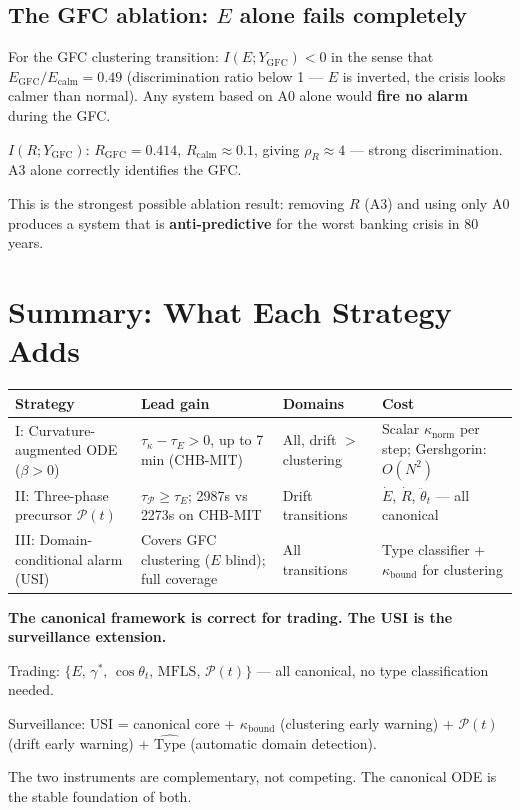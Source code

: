 \documentclass[11pt,a4paper]{article}
\theoremstyle{definition}
\begin{document}
\subsection{The GFC ablation: $E$ alone fails completely}

For the GFC clustering transition:
$I(E; Y_\mathrm{GFC}) < 0$ in the sense that $E_\mathrm{GFC}/E_\mathrm{calm} = 0.49$
(discrimination ratio below 1 --- $E$ is inverted, the crisis looks calmer than normal).
Any system based on A0 alone would \textbf{fire no alarm} during the GFC.

$I(R; Y_\mathrm{GFC})$: $R_\mathrm{GFC} = 0.414$, $R_\mathrm{calm} \approx 0.1$,
giving $\rho_R \approx 4$ --- strong discrimination.
A3 alone correctly identifies the GFC.

This is the strongest possible ablation result: removing $R$ (A3)
and using only A0 produces a system that is \textbf{anti-predictive}
for the worst banking crisis in 80 years.

\section{Summary: What Each Strategy Adds}
\label{sec:ew_summary}

\begin{center}
\renewcommand{\arraystretch}{1.4}
\begin{tabular}{p{3.5cm}p{3cm}p{3cm}p{3.5cm}}
\toprule
\textbf{Strategy} & \textbf{Lead gain} & \textbf{Domains} & \textbf{Cost} \\
\midrule
I: Curvature-augmented ODE ($\beta > 0$) &
$\tau_\kappa - \tau_E > 0$, up to 7 min (CHB-MIT) &
All, drift $>$ clustering &
Scalar $\kappa_\mathrm{norm}$ per step; Gershgorin: $O(N^2)$ \\
II: Three-phase precursor $\mathcal{P}(t)$ &
$\tau_\mathcal{P} \geq \tau_E$; 2987s vs 2273s on CHB-MIT &
Drift transitions &
$\dot E$, $\dot R$, $\ddot\theta_t$ — all canonical \\
III: Domain-conditional alarm (USI) &
Covers GFC clustering ($E$ blind); full coverage &
All transitions &
Type classifier + $\kappa_\mathrm{bound}$ for clustering \\
\bottomrule
\end{tabular}
\end{center}

\begin{lockedbox}
\textbf{The canonical framework is correct for trading.
The USI is the surveillance extension.}

Trading: $\{E,\,\gamma^*,\,\cos\theta_t,\,\mathrm{MFLS},\,\mathcal{P}(t)\}$
--- all canonical, no type classification needed.

Surveillance: USI = canonical core + $\kappa_\mathrm{bound}$ (clustering early warning)
+ $\mathcal{P}(t)$ (drift early warning)
+ $\widehat{\mathrm{Type}}$ (automatic domain detection).

The two instruments are complementary, not competing.
The canonical ODE is the stable foundation of both.
\end{lockedbox}
\end{document}
